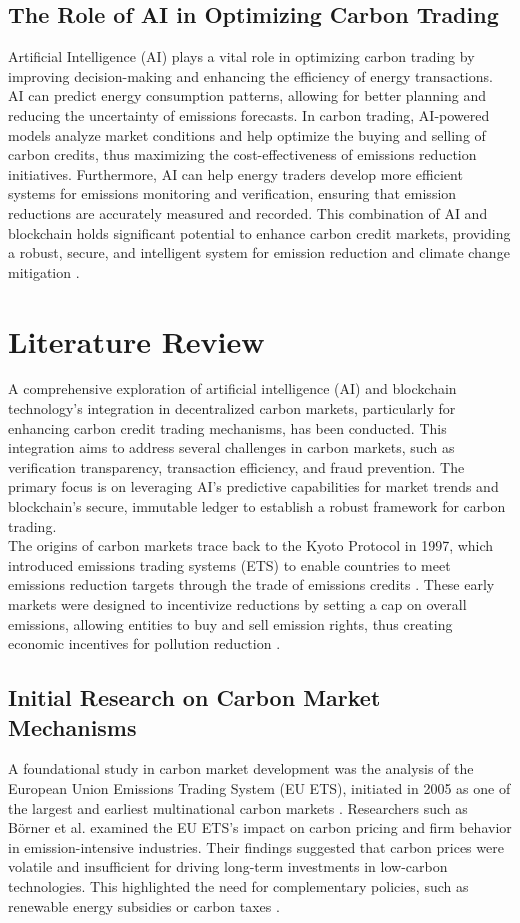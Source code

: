 \documentclass[preprint,12pt]{elsarticle}
\begin{document}
\subsection{The Role of AI in Optimizing Carbon Trading}
Artificial Intelligence (AI) plays a vital role in optimizing carbon trading by improving decision-making and enhancing the efficiency of energy transactions. AI can predict energy consumption patterns, allowing for better planning and reducing the uncertainty of emissions forecasts. In carbon trading, AI-powered models analyze market conditions and help optimize the buying and selling of carbon credits, thus maximizing the cost-effectiveness of emissions reduction initiatives. Furthermore, AI can help energy traders develop more efficient systems for emissions monitoring and verification, ensuring that emission reductions are accurately measured and recorded. This combination of AI and blockchain holds significant potential to enhance carbon credit markets, providing a robust, secure, and intelligent system for emission reduction and climate change mitigation \citep{wu2022sustainable}.
\section{Literature Review}
A comprehensive exploration of artificial intelligence (AI) and blockchain technology’s integration in decentralized carbon markets, particularly for enhancing carbon credit trading mechanisms, has been conducted. This integration aims to address several challenges in carbon markets, such as verification transparency, transaction efficiency, and fraud prevention. The primary focus is on leveraging AI’s predictive capabilities for market trends and blockchain’s secure, immutable ledger to establish a robust framework for carbon trading.\\
The origins of carbon markets trace back to the Kyoto Protocol in 1997, which introduced emissions trading systems (ETS) to enable countries to meet emissions reduction targets through the trade of emissions credits \citep{ref9}. These early markets were designed to incentivize reductions by setting a cap on overall emissions, allowing entities to buy and sell emission rights, thus creating economic incentives for pollution reduction \citep{ref10}.
\subsection{Initial Research on Carbon Market Mechanisms}
A foundational study in carbon market development was the analysis of the European Union Emissions Trading System (EU ETS), initiated in 2005 as one of the largest and earliest multinational carbon markets \citep{ref11}. Researchers such as Börner et al. \citep{ref12} examined the EU ETS’s impact on carbon pricing and firm behavior in emission-intensive industries. Their findings suggested that carbon prices were volatile and insufficient for driving long-term investments in low-carbon technologies. This highlighted the need for complementary policies, such as renewable energy subsidies or carbon taxes \citep{ref13}.
\end{document}
